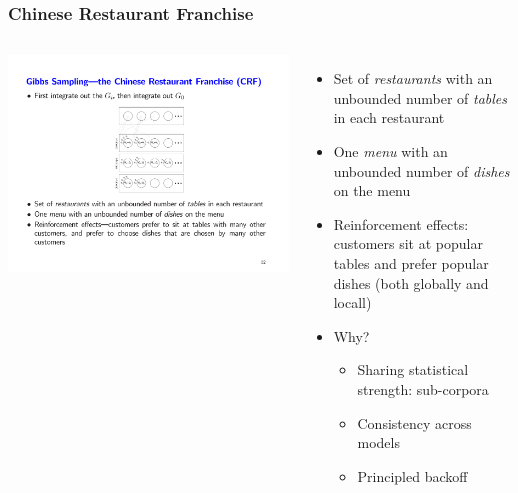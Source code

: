 \begin{frame}
	\frametitle{Chinese Restaurant Franchise}

	\begin{columns}
\begin{center}
	\includegraphics[width=1\linewidth]{topic_models/cr_franchise}
\end{center}


	\begin{itemize}
		\item Set of \emph{restaurants} with an unbounded number of \emph{tables} in each restaurant
		\item One \emph{menu} with an unbounded number of \emph{dishes} on the menu
		\item Reinforcement effects: customers sit at popular tables and prefer popular dishes (both globally and locall)
		\item Why?
		\begin{itemize}
			\item Sharing statistical strength: sub-corpora
			\item Consistency across models
			\item Principled backoff\cite{teh-06}
		\end{itemize}
	\end{itemize}

	\end{columns}
\end{frame}

\fi


